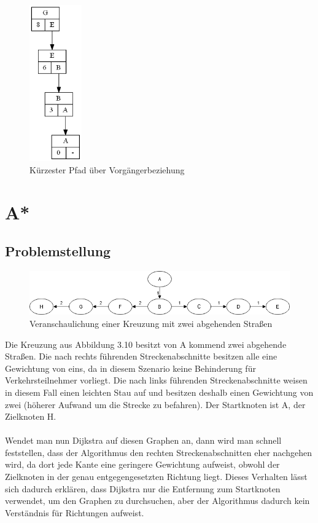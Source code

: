 \documentclass[11pt]{scrreprt}
\begin{document}
			\begin{figure}[ht]
				\centering
				\includegraphics[width=0.2\textwidth]{Graphs/ExamplePath}
				\caption{Kürzester Pfad über Vorgängerbeziehung}
			\end{figure}
			\FloatBarrier
\newpage
\section{A*}
\subsection{Problemstellung}
\begin{figure}[ht]
	\centering
	\includegraphics[width=1\textwidth]{Graphs/ExampleHighway}
	\caption{Veranschaulichung einer Kreuzung mit zwei abgehenden Straßen}
\end{figure}
\FloatBarrier
Die Kreuzung aus Abbildung 3.10 besitzt von A kommend zwei abgehende Straßen.
Die nach rechts führenden Streckenabschnitte besitzen alle eine Gewichtung von eins, da in diesem Szenario keine Behinderung für Verkehrsteilnehmer vorliegt. 
Die nach links führenden Streckenabschnitte weisen in diesem Fall einen leichten Stau auf und besitzen deshalb einen Gewichtung von zwei (höherer Aufwand um die Strecke zu befahren). \cite{youtube:english:dijkstra}
Der Startknoten ist A, der Zielknoten H.
\\\\
Wendet man nun Dijkstra auf diesen Graphen an, dann wird man schnell feststellen, dass der Algorithmus den rechten Streckenabschnitten eher nachgehen wird, da dort jede Kante eine geringere Gewichtung aufweist, obwohl der Zielknoten in der genau entgegengesetzten Richtung liegt.
Dieses Verhalten lässt sich dadurch erklären, dass Dijkstra nur die Entfernung zum Startknoten verwendet, um den Graphen zu durchsuchen, aber der Algorithmus dadurch kein Verständnis für Richtungen aufweist.
\end{document}
